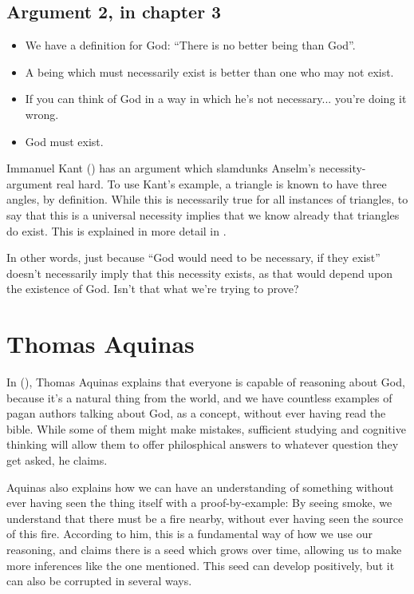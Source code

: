 \documentclass{article}
\begin{document}
	\subsection*{Argument 2, in chapter 3}
	\begin{itemize}
		\item We have a definition for God: ``There is no better being than God''.
		\item A being which must necessarily exist is better than one who may not exist.
		\item If you can think of God in a way in which he's not necessary... you're doing it wrong.
		\item God must exist.
	\end{itemize}

	Immanuel Kant (\citeyear{kant1781}) has an argument which slamdunks Anselm's necessity-argument real hard. To use Kant's example, a triangle is known to have three angles, by definition. While this is necessarily true for all instances of triangles, to say that this is a universal necessity implies that we know already that triangles do exist. This is explained in more detail in  \autocite{grier2004}.

	In other words, just because ``God would need to be necessary, if they exist'' doesn't necessarily imply that this necessity exists, as that would depend upon the existence of God. Isn't that what we're trying to prove?
	

	\section*{Thomas Aquinas}
	In  (\citeyear{aquinas1485}), Thomas Aquinas explains that everyone is capable of reasoning about God, because it's a natural thing from the world, and we have countless examples of pagan authors talking about God, as a concept, without ever having read the bible. While some of them might make mistakes, sufficient studying and cognitive thinking will allow them to offer philosphical answers to whatever question they get asked, he claims.

	Aquinas also explains how we can have an understanding of something without ever having seen the thing itself with a proof-by-example: By seeing smoke, we understand that there must be a fire nearby, without ever having seen the source of this fire. According to him, this is a fundamental way of how we use our reasoning, and claims there is a seed which grows over time, allowing us to make more inferences like the one mentioned. This seed can develop positively, but it can also be corrupted in several ways.
\end{document}
